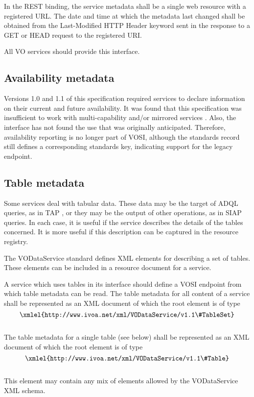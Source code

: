 \documentclass[11pt,letter]{ivoa}
\begin{document}
In the REST binding, the service metadata shall be a single web resource
with a registered URL. The date and time at which the metadata last
changed shall be obtained from the Last-Modified HTTP Header keyword
sent in the response to a GET or HEAD request to the registered URI.

All VO services should provide this interface. 

\subsection{Availability metadata}
\label{sect:availability}

Versions 1.0 and 1.1 of this specification required services to declare
information on their current and future availability.  It was found that
this specification was insufficient to work with multi-capability and/or
mirrored services \citep{note:caproles}.  Also, the interface has not
found the use that was originally anticipated.  Therefore, availability
reporting is no longer part of VOSI, although the standards record still
defines a corresponding standards key, indicating support for the legacy
endpoint.


\subsection{Table metadata}

 Some services deal with tabular data. These data may be the target of
 ADQL queries, as in TAP \citep{2019ivoa.spec.0927D}, or they may be the
 output of other operations, as in SIAP queries. In each case, it is
 useful if the service describes the details of the tables concerned. It
 is more useful if this description can be captured in the resource
 registry.

The VODataService standard \citep{2021ivoa.spec.1102D} defines XML
elements for describing a set of tables. These elements can be included
in a resource document for a service.

A service which uses tables in its interface should define a VOSI
endpoint from which table metadata can be read. The table metadata for
all content of a service shall be represented as an XML document of
which the root element is of type\\
$$\hbox{\xmlel{http://www.ivoa.net/xml/VODataService/v1.1\#TableSet}}$$\\
The table metadata for a single table (see below) shall be represented as an
XML document of which the root element is of type\\
$$\hbox{\xmlel{http://www.ivoa.net/xml/VODataService/v1.1\#Table}}$$\\
This element may contain any mix of elements allowed by the VODataService XML schema.
\end{document}

